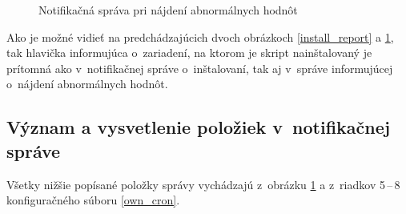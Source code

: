 \begin{figure}[H]
	\begin{center}
		\caption{Notifikačná správa pri nájdení abnormálnych hodnôt}
		\label{notif_report}
	\end{center}
\end{figure} 

Ako je možné vidieť na predchádzajúcich dvoch obrázkoch \ref{install_report} a \ref{notif_report}, tak hlavička informujúca o~zariadení, na ktorom je skript nainštalovaný je prítomná ako v~notifikačnej správe o~inštalovaní, tak aj v~správe informujúcej o~nájdení abnormálnych hodnôt.

\newpage
\subsection*{Význam a vysvetlenie položiek v~notifikačnej správe}
Všetky nižšie popísané položky správy vychádzajú z~obrázku \ref{notif_report} a z~riadkov 5\,--\,8 konfiguračného súboru \ref{own_cron}.

